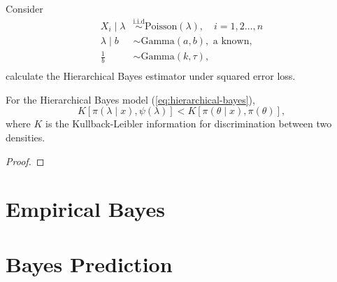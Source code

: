 \begin{example}
    Consider
    \begin{equation}
        \begin{aligned}
            X_i\mid\lambda & \stackrel{\text{i.i.d}}{\sim} \text{Poisson}\left(\lambda\right),\quad i=1,2\ldots,n \\
            \lambda\mid b  & \sim \text{Gamma}\left(a,b\right), \text{ a known},                                  \\
            \frac{1}{b}    & \sim \text{Gamma}\left(k,\tau\right),                                                \\
        \end{aligned}
    \end{equation}
    calculate the Hierarchical Bayes estimator under squared error loss.
\end{example}


\begin{theorem}
    For the Hierarchical Bayes model (\ref{eq:hierarchical-bayes}),
    \begin{equation}
        K\left[\pi\left(\lambda\mid x\right),\psi\left(\lambda\right)\right] < K\left[\pi\left(\theta\mid x\right),\pi\left(\theta\right)\right],
    \end{equation}
    where $K$ is the Kullback-Leibler information for discrimination between two densities.
\end{theorem}

\begin{proof}

\end{proof}

\begin{remark}

\end{remark}

\section{Empirical Bayes}

\section{Bayes Prediction}